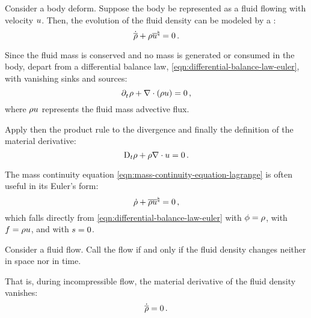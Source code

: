 \begin{model}
  Consider a body deform. Suppose the body be represented as a fluid flowing with velocity $u$. Then, the evolution of the fluid density can be modeled by a :
  \begin{equation}\label{eqn:mass-continuity-equation-lagrange}
    \dot{\overline{\rho}} + \rho{\overline{u}}^{\natural} = 0\,.
  \end{equation}
\end{model}
%
\begin{argument}
  Since the fluid mass is conserved and no mass is generated or consumed in the body, depart from a differential balance law, \cref{eqn:differential-balance-law-euler}, with vanishing sinks and sources:
  \begin{equation*}%
    \cpd t\dens + \odiv\vat{\dens\vel} = 0\,,
  \end{equation*}
  where $\rho u$ represents the fluid mass advective flux.

  Apply then the product rule to the divergence and finally the definition of the material derivative:
  \begin{equation*}
    \mathrm{D}_{t}\rho + \rho\nabla\cdot u = 0\,.
  \end{equation*}
\end{argument}
%
The mass continuity equation \cref{eqn:mass-continuity-equation-lagrange} is often useful in its Euler's form:
%
\begin{equation}\label{eqn:mass-continuity-equation-euler}
  \dot{\rho} + {\overline{\rho u}}^{\natural} = 0\,,
\end{equation}
%
which falls directly from \cref{eqn:differential-balance-law-euler} with $\phi = \rho$, with $f = \rho u$, and with $s = 0$.

\begin{definition}
  Consider a fluid flow. Call the flow  if and only if the fluid density changes neither in space nor in time.
\end{definition}
%
That is, during incompressible flow, the material derivative of the fluid density vanishes:
%
\begin{equation}\label{eqn:definition-incompressible-flow}
  \dot{\overline{\rho}} = 0\,.
\end{equation}

